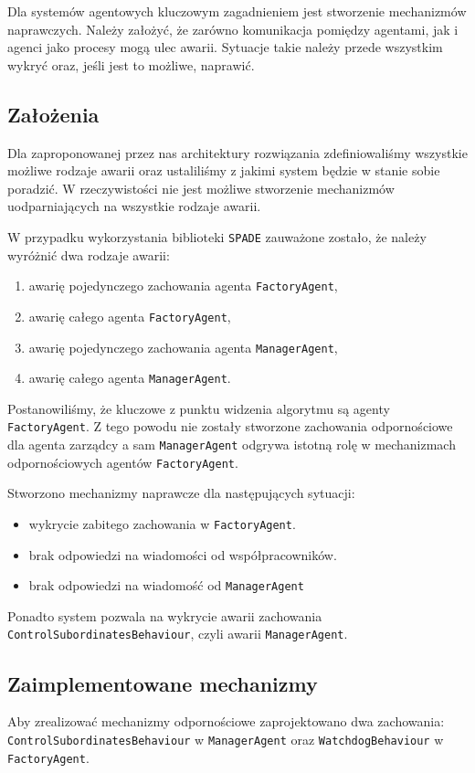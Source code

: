 
Dla systemów agentowych kluczowym zagadnieniem jest stworzenie mechanizmów naprawczych. Należy założyć, że zarówno komunikacja pomiędzy agentami, jak i agenci jako procesy mogą ulec awarii. Sytuacje takie należy przede wszystkim wykryć oraz, jeśli jest to możliwe, naprawić. 

\subsection{Założenia}

Dla zaproponowanej przez nas architektury rozwiązania zdefiniowaliśmy wszystkie możliwe rodzaje awarii oraz ustaliliśmy z jakimi system będzie w stanie sobie poradzić. W rzeczywistości nie jest możliwe stworzenie mechanizmów uodparniających na wszystkie rodzaje awarii. 

W przypadku wykorzystania biblioteki \texttt{SPADE} zauważone zostało, że należy wyróżnić dwa rodzaje awarii:
\begin{enumerate}
	\item awarię pojedynczego zachowania agenta \texttt{FactoryAgent},
	\item awarię całego agenta \texttt{FactoryAgent},
	\item awarię pojedynczego zachowania agenta \texttt{ManagerAgent},
	\item awarię całego agenta \texttt{ManagerAgent}.
\end{enumerate}

Postanowiliśmy, że kluczowe z punktu widzenia algorytmu są agenty \texttt{FactoryAgent}. Z tego powodu nie zostały stworzone zachowania odpornościowe dla agenta zarządcy a sam \texttt{ManagerAgent} odgrywa istotną rolę w mechanizmach odpornościowych agentów \texttt{FactoryAgent}. 
 
Stworzono mechanizmy naprawcze dla następujących sytuacji:
\begin{itemize}
	\item wykrycie zabitego zachowania w \texttt{FactoryAgent}.
	\item brak odpowiedzi na wiadomości od współpracowników.
	\item brak odpowiedzi na wiadomość od \texttt{ManagerAgent}
\end{itemize}

Ponadto system pozwala na wykrycie awarii zachowania \texttt{ControlSubordinatesBehaviour}, czyli awarii \texttt{ManagerAgent}.

\subsection{Zaimplementowane mechanizmy}
Aby zrealizować mechanizmy odpornościowe zaprojektowano dwa zachowania: \texttt{ControlSubordinatesBehaviour} w \texttt{ManagerAgent} oraz \texttt{WatchdogBehaviour} w \texttt{FactoryAgent}.

